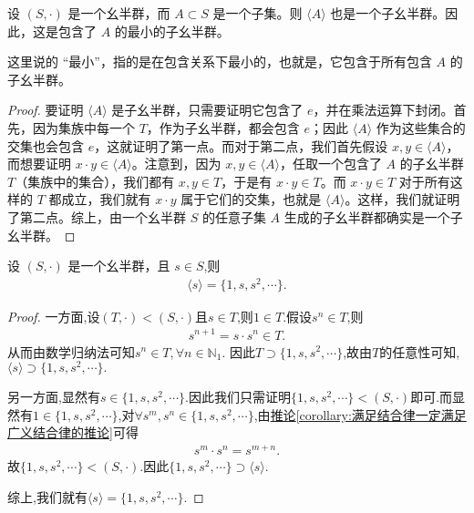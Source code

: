 \documentclass[../../main.tex]{subfiles}
\begin{document}
\begin{proposition}[由子集生成的子幺半群是包含了这个子集的最小的子幺半群]
设 $(S, \cdot)$ 是一个幺半群，而 $A \subset S$ 是一个子集。则 $\langle A \rangle$ 也是一个子幺半群。因此，这是包含了 $A$ 的最小的子幺半群。
\end{proposition}
\begin{remark}
这里说的 “最小”，指的是在包含关系下最小的，也就是，它包含于所有包含 $A$ 的子幺半群。
\end{remark}
\begin{proof}
要证明 $\langle A \rangle$ 是子幺半群，只需要证明它包含了 $e$，并在乘法运算下封闭。首先，因为集族中每一个 $T$，作为子幺半群，都会包含 $e$；因此 $\langle A \rangle$ 作为这些集合的交集也会包含 $e$，这就证明了第一点。而对于第二点，我们首先假设 $x, y \in \langle A \rangle$，而想要证明 $x \cdot y \in \langle A \rangle$。注意到，因为 $x, y \in \langle A \rangle$，任取一个包含了 $A$ 的子幺半群 $T$（集族中的集合），我们都有 $x, y \in T$，于是有 $x \cdot y \in T$。而 $x \cdot y \in T$ 对于所有这样的 $T$ 都成立，我们就有 $x \cdot y$ 属于它们的交集，也就是 $\langle A \rangle$。这样，我们就证明了第二点。综上，由一个幺半群 $S$ 的任意子集 $A$ 生成的子幺半群都确实是一个子幺半群。 

\end{proof}

\begin{proposition}\label{proposition:由单个元素生成的子幺半群的集合表示}
设 $(S, \cdot)$ 是一个幺半群，且 $s \in S$,则
\begin{align*}
\langle s\rangle =\{1,s,s^2,\cdots\}.
\end{align*} 
\end{proposition}
\begin{proof}
一方面,设$(T,\cdot)<(S,\cdot)$且$s\in T$,则$1\in T$.假设$s^n\in T$,则
\begin{align*}
s^{n+1}=s\cdot s^n\in T.
\end{align*}
从而由数学归纳法可知$s^n\in T,\forall n\in \mathbb{N}_1$.
因此$T\supset \{1,s,s^2,\cdots\}$,故由$T$的任意性可知,$\langle s\rangle\supset \{1,s,s^2,\cdots\}.$

另一方面,显然有$s\in \{1,s,s^2,\cdots\}$.因此我们只需证明$\{1,s,s^2,\cdots\}<(S,\cdot)$即可.而显然有$1\in \{1,s,s^2,\cdots\}$,对$\forall s^m,s^n\in \{1,s,s^2,\cdots\}$,由\hyperref[corollary:满足结合律一定满足广义结合律的推论]{推论\ref{corollary:满足结合律一定满足广义结合律的推论}}可得
\begin{align*}
s^m\cdot s^n=s^{m+n}.
\end{align*}
故$\{1,s,s^2,\cdots\}<(S,\cdot)$.因此$\{1,s,s^2,\cdots\}\supset \langle s\rangle.$

综上,我们就有$\langle s\rangle =\{1,s,s^2,\cdots\}.$

\end{proof}
\end{document}
